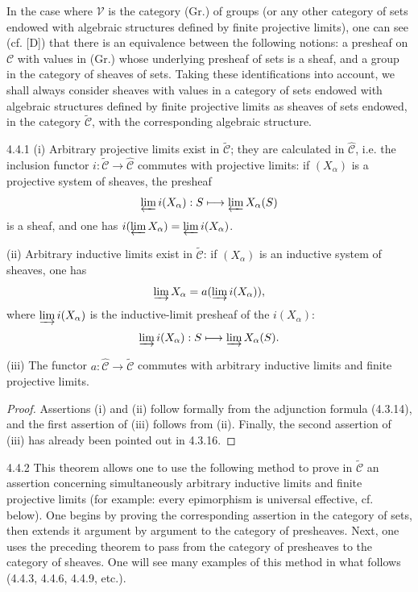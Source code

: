 In the case where \(\mathcal V\) is the category (Gr.) of groups
(or any other category of sets endowed with algebraic structures
defined by finite projective limits), one can see (cf. [D]) that
there is an equivalence between the following notions: a presheaf
on \(\mathcal C\) with values in (Gr.) whose underlying presheaf
of sets is a sheaf, and a group in the category of sheaves of sets.
Taking these identifications into account, we shall always
consider sheaves with values in a category of sets endowed with
algebraic structures defined by finite projective limits as
sheaves of sets endowed, in the category \(\widetilde{\mathcal C}\),
with the corresponding algebraic structure.

\begin{theorem}{4.4.1}\label{IV.4.4.1}
(i) Arbitrary projective limits exist in \(\widetilde{\mathcal C}\);
\og they are calculated in \(\widehat{\mathcal C}\)\fg, i.e. the
inclusion functor \(i:\widetilde{\mathcal C}\to\widehat{\mathcal C}\)
commutes with projective limits: if \((X_\alpha)\) is a projective
system of sheaves, the presheaf
\[
\varprojlim i(X_\alpha):S\longmapsto\varprojlim X_\alpha(S)
\]
is a sheaf, and one has
\(i(\varprojlim X_\alpha)=\varprojlim i(X_\alpha)\).

(ii) Arbitrary inductive limits exist in \(\widetilde{\mathcal C}\):
if \((X_\alpha)\) is an inductive system of sheaves, one has
\[
\varinjlim X_\alpha=a(\varinjlim i(X_\alpha)),
\]
where \(\varinjlim i(X_\alpha)\) is the inductive-limit presheaf of
the \(i(X_\alpha)\):
\[
\varinjlim i(X_\alpha):S\longmapsto\varinjlim X_\alpha(S).
\]

(iii) The functor \(a:\widehat{\mathcal C}\to\widetilde{\mathcal C}\)
commutes with arbitrary inductive limits and finite projective limits.
\end{theorem}
\begin{proof}
Assertions (i) and (ii) follow formally from the adjunction formula
(4.3.14), and
the first assertion of (iii) follows from (ii).
Finally, the second assertion of (iii) has already been pointed
out in 4.3.16.
\end{proof}

\begin{scholium}{4.4.2}\label{IV.4.4.2}
This theorem allows one to use the following method to prove in
\(\widetilde{\mathcal C}\) an assertion concerning simultaneously
arbitrary inductive limits and finite projective limits (for example:
\og every epimorphism is universal effective\fg, cf. below).
One begins by proving the corresponding assertion in the category
of sets, then extends it \og argument by argument\fg{} to the
category of presheaves. Next, one uses the preceding theorem to
pass from the category of presheaves to the category of sheaves.
One will see many examples of this method in what follows
(4.4.3, 4.4.6, 4.4.9, etc.).
\end{scholium}

